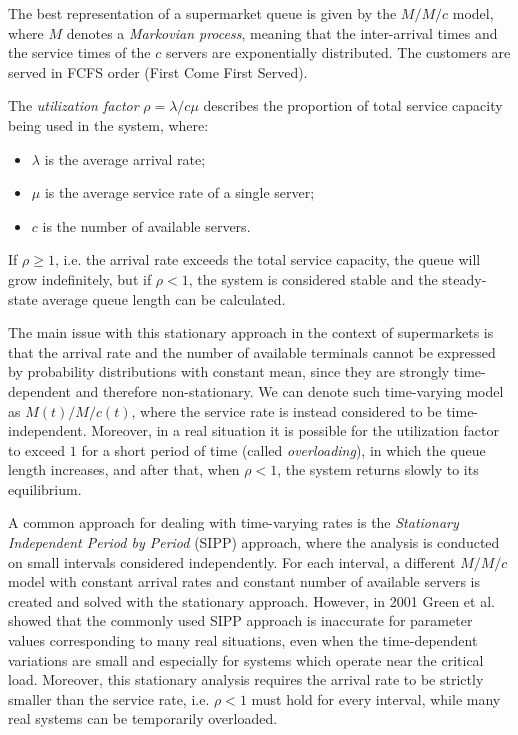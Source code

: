 The best representation of a supermarket queue is given by the \( M/M/c \) model, where \( M \) denotes a \emph{Markovian process}, meaning that the inter-arrival times and the service times of the \( c \) servers are exponentially distributed. The customers are served in FCFS order (First Come First Served).

The \emph{utilization factor} \( \rho = \lambda/c\mu \) describes the proportion of total service capacity being used in the system, where:
\begin{itemize}
  \item \( \lambda \) is the average arrival rate;
  \item \( \mu \) is the average service rate of a single server;
  \item \( c \) is the number of available servers.
\end{itemize}
If \( \rho \ge 1 \), i.e. the arrival rate exceeds the total service capacity, the queue will grow indefinitely, but if \( \rho < 1 \), the system is considered stable and the steady-state average queue length can be calculated.

The main issue with this stationary approach in the context of supermarkets is that the arrival rate and the number of available terminals cannot be expressed by probability distributions with constant mean, since they are strongly time-dependent and therefore non-stationary. We can denote such time-varying model as \( M(t)/M/c(t) \), where the service rate is instead considered to be time-independent. Moreover, in a real situation it is possible for the utilization factor to exceed \( 1 \) for a short period of time (called \emph{overloading}), in which the queue length increases, and after that, when \( \rho < 1 \), the system returns slowly to its equilibrium.

A common approach for dealing with time-varying rates is the \emph{Stationary Independent Period by Period} (SIPP) approach, where the analysis is conducted on small intervals considered independently. For each interval, a different \( M/M/c \) model with constant arrival rates and constant number of available servers is created and solved with the stationary approach. However, in 2001 Green et al.~\cite{green2001} showed that the commonly used SIPP approach is inaccurate for parameter values corresponding to many real situations, even when the time-dependent variations are small and especially for systems which operate near the critical load. Moreover, this stationary analysis requires the arrival rate to be strictly smaller than the service rate, i.e. \( \rho < 1 \) must hold for every interval, while many real systems can be temporarily overloaded.

